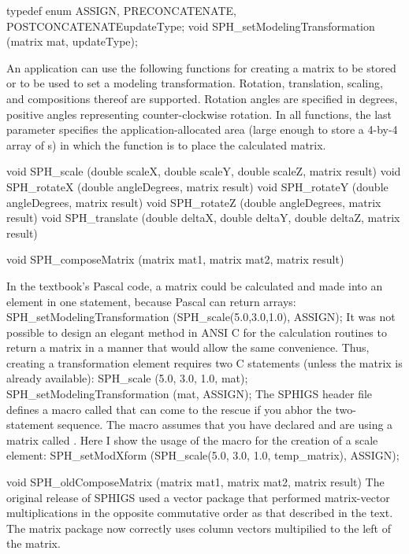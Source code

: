 \begincode
typedef enum \lb{}ASSIGN, PRECONCATENATE, POSTCONCATENATE\rb updateType;
void SPH_setModelingTransformation (matrix mat, updateType);  \elementgenerator
\endcode

\newpar
An application can use the following functions for creating a matrix to be
stored or to be used to set a modeling transformation.  Rotation, translation,
scaling, and compositions thereof are supported.  Rotation angles are specified
in degrees, positive angles representing counter-clockwise rotation.  In all
functions, the last parameter specifies the application-allocated area (large
enough to store a 4-by-4 array of s) in which the function is to
place the calculated matrix.

\begincode
void SPH_scale (double scaleX, double scaleY, double scaleZ,  matrix result) 
void SPH_rotateX (double angleDegrees,  matrix result)
void SPH_rotateY (double angleDegrees,  matrix result)
void SPH_rotateZ (double angleDegrees,  matrix result)
void SPH_translate 
     (double deltaX, double deltaY, double deltaZ,  matrix result)

void SPH_composeMatrix (matrix mat1, matrix mat2, matrix result)
\endcode

\newpar
In the textbook's Pascal code, a matrix could be calculated and made into an
element in one statement, because Pascal can return arrays:
\begincode
   SPH_setModelingTransformation (SPH_scale(5.0,3.0,1.0), ASSIGN);
\endcode
\newpar
It was not possible to design an elegant method in ANSI C for the calculation
routines to return a matrix in a manner that would allow the same convenience.
Thus, creating a transformation element requires two C statements (unless the
matrix is already available):
\begincode
   SPH_scale (5.0, 3.0, 1.0,  mat);
   SPH_setModelingTransformation (mat, ASSIGN);
\endcode
\newpar
The SPHIGS header file  defines a macro called
 that can come to the rescue if you abhor the 
two-statement sequence.  The macro assumes that you have declared and are using
a matrix called .  Here I show the usage of the macro for
the creation of a scale element:
\begincode
   SPH_setModXform (SPH_scale(5.0, 3.0, 1.0, temp_matrix), ASSIGN);
\endcode

\newpar
\begincode
void SPH_oldComposeMatrix (matrix mat1, matrix mat2, matrix result)
\endcode
{} The original release of SPHIGS used a vector package that
performed matrix-vector multiplications in the opposite commutative
order as that described in the text.  The matrix package now correctly
uses column vectors multipilied to the left of the matrix.

